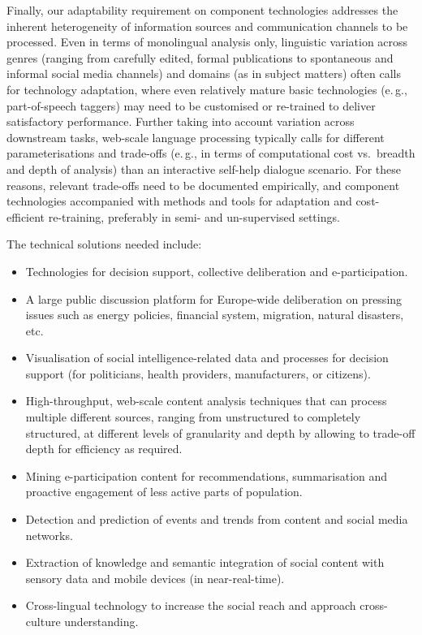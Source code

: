 \documentclass[10pt, plain]{../../metanetpaper}
\begin{document}
\begin{multicols}{2}
Finally, our adaptability requirement on component technologies addresses the inherent heterogeneity of information sources and communication channels to be processed. Even in terms of monolingual analysis only, linguistic variation across genres (ranging from carefully edited, formal publications to spontaneous and informal social media channels) and domains (as in subject matters) often calls for technology adaptation, where even relatively mature basic technologies (e.\,g., part-of-speech taggers) may need to be customised or re-trained to deliver satisfactory performance. Further taking into account variation across downstream tasks, web-scale language processing typically calls for different parameterisations and trade-offs (e.\,g., in terms of computational cost vs.~breadth and depth of analysis) than an interactive self-help dialogue scenario. For these reasons, relevant trade-offs need to be documented empirically, and component technologies accompanied with methods and tools for adaptation and cost-efficient re-training, preferably in semi- and un-supervised settings.
 
The technical solutions needed include:

\begin{itemize}
\item Technologies for decision support, collective deliberation and e-participation.
\item A large public discussion platform for Europe-wide deliberation on pressing issues such as energy policies, financial system, migration, natural disasters, etc.
\item Visualisation of social intelligence-related data and processes for decision support (for politicians, health providers, manufacturers, or citizens).
\item High-throughput, web-scale content analysis techniques that can process multiple different sources, ranging from unstructured to completely structured, at different levels of granularity and depth by allowing to trade-off depth for efficiency as required.
\item Mining e-participation content for recommendations, summarisation and proactive engagement of less active parts of population.
\item Detection and prediction of events and trends from content and social media networks.
\item Extraction of knowledge and semantic integration of social content with sensory data and mobile devices (in near-real-time).
\item Cross-lingual technology to increase the social reach and approach cross-culture understanding.
\end{itemize}


\end{multicols}
\end{document}
